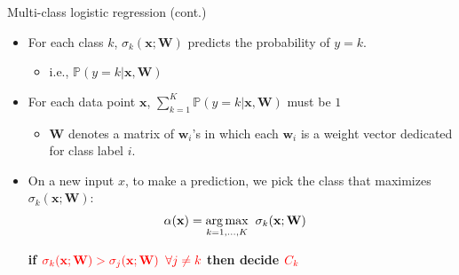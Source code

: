 \documentclass[serif, aspectratio=169]{beamer}
\begin{document}
\begin{frame}{Multi-class logistic regression (cont.)}
    \begin{itemize}
         \item For each class $k$, $\sigma _k(\mathbf{x}; \mathbf{W})$ predicts the probability of $y=k$.
            \begin{itemize}
                \item i.e., $\mathbb{P}(y=k|\mathbf{x}, \mathbf{W})$
            \end{itemize}
        \item For each data point $\mathbf{x}$, $\sum _{k=1}^{K} \mathbb{P}(y=k|\mathbf{x}, \mathbf{W})$ must be $1$
            \begin{itemize}
                \item $\mathbf{W}$ denotes a matrix of $\mathbf{w}_i$'s in which each $\mathbf{w}_i$ is a weight vector dedicated for class label $i$.
            \end{itemize}
        \item On a new input $x$, to make a prediction, we pick the class that maximizes $\sigma _k(\mathbf{x}; \mathbf{W})$:
            \begin{align*}
                \alpha (\mathbf{x}) &= \underset{k=1, \dots , K}{\arg\max} \hspace{0.2cm} \sigma _k(\mathbf{x}; \mathbf{W}) 
            \end{align*}
            \begin{center}
                \textbf{if $\color{red} \sigma _k(\mathbf{x}; \mathbf{W}) > \sigma _j(\mathbf{x}; \mathbf{W})$ $\color{red} \forall j \neq k$ then decide $\color{red} C_k$}
            \end{center}
    \end{itemize}
\end{frame}
\end{document}
